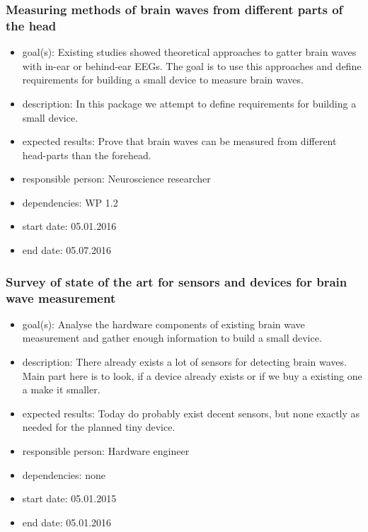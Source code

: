 \subsubsection{Measuring methods of brain waves from different parts of the head}
\begin{itemize}
 \item goal(s): Existing studies showed theoretical approaches to gatter brain waves with in-ear or behind-ear EEGs. The goal is to use this approaches and define requirements for building a small device to measure brain waves.
 \item description: In this package we attempt to define requirements for building a small device.
 \item expected results: Prove that brain waves can be measured from different head-parts than the forehead.
 \item responsible person: Neuroscience researcher
 \item dependencies: WP 1.2
 \item start date: 05.01.2016
 \item end date: 05.07.2016
\end{itemize}

\subsubsection{Survey of state of the art for sensors and devices for brain wave measurement}
\begin{itemize}
 \item goal(s): Analyse the hardware components of existing brain wave measurement and gather enough information to build a small device.
 \item description: There already exists a lot of sensors for detecting brain waves. Main part here is to look, if a device already exists or if we buy a existing one a make it smaller.
 \item expected results: Today do probably exist decent sensors, but none exactly as needed for the planned tiny device.
 \item responsible person: Hardware engineer
 \item dependencies: none
 \item start date: 05.01.2015
 \item end date: 05.01.2016
\end{itemize}

